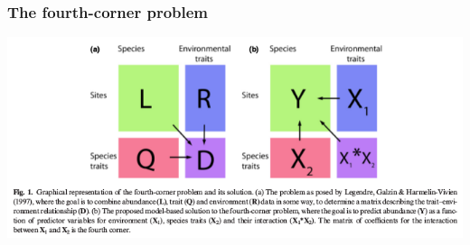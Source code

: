 \documentclass{beamer}
\begin{document}
\begin{frame}
  \frametitle{The fourth-corner problem}

  \begin{center}
    \includegraphics[height=0.8\textheight,width=\textwidth,keepaspectratio=true]{figure/warton_fourth_corner}
  \end{center}

\end{frame}
\end{document}
